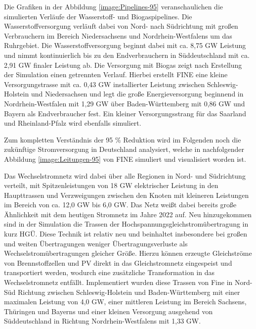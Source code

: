 Die Grafiken in der Abbildung \ref{image:Pipelines-95} veranschaulichen die simulierten Verläufe der Wasserstoff- und Biogaspipelines. Die Wasserstoffversorgung verläuft dabei von Nord- nach Südrichtung mit großen Verbrauchern im Bereich Niedersachsens und Nordrhein-Westfalens um das Ruhrgebiet. Die Wasserstoffversorgung beginnt dabei mit ca. 8,75 GW Leistung und nimmt kontinuierlich bis zu den Endverbrauchern in Süddeutschland mit ca. 2,91 GW finaler Leistung ab. Die Versorgung mit Biogas zeigt nach Erstellung der Simulation einen getrennten Verlauf. Hierbei erstellt FINE eine kleine Versorgungstrasse mit ca. 0,43 GW installierter Leistung zwischen Schleswig-Holstein und Niedersachsen und legt die große Energieversorgung beginnend in Nordrhein-Westfalen mit 1,29 GW über Baden-Württemberg mit 0,86 GW und Bayern als Endverbraucher fest. Ein kleiner Versorgungsstrang für das Saarland und Rheinland-Pfalz wird ebenfalls simuliert.

Zum kompletten Verständnis der 95 \% Reduktion wird im Folgenden noch die zukünftige Stromversorgung in Deutschland analysiert, welche in nachfolgender Abbildung \ref{image:Leitungen-95} von FINE simuliert und visualisiert worden ist.

Das Wechselstromnetz wird dabei über alle Regionen in Nord- und Südrichtung verteilt, mit Spitzenleistungen von 18 GW elektrischer Leistung in den Haupttrassen und Verzweigungen zwischen den Knoten mit kleineren Leistungen im Bereich von ca. 12,0 GW bis 6,0 GW. Das Netz weißt dabei bereits große Ähnlichkeit mit dem heutigen Stromnetz im Jahre 2022 auf. Neu hinzugekommen sind in der Simulation die Trassen der Hochspannungsgleichstromübertragung in kurz HGÜ. Diese Technik ist relativ neu und beinhaltet insbesondere bei großen und weiten Übertragungen weniger Übertragungsverluste als Wechselstromübertragungen gleicher Größe. Hierzu können erzeugte Gleichströme von Brennstoffzellen und PV direkt in das Gleichstromnetz eingespeist und transportiert werden, wodurch eine zusätzliche Transformation in das Wechselstromnetz entfällt. Implementiert wurden diese Trassen von Fine in Nord- Süd Richtung zwischen Schleswig-Holstein und Baden-Württemberg mit einer maximalen Leistung von 4,0 GW, einer mittleren Leistung im Bereich Sachsens, Thüringen und Bayerns und einer kleinen Versorgung ausgehend von Süddeutschland in Richtung Nordrhein-Westfalens mit 1,33 GW.

